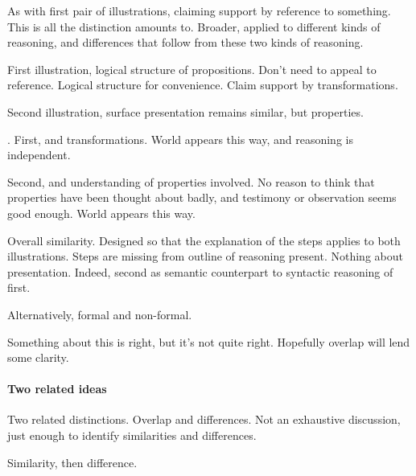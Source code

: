 \begin{note}
  As with first pair of illustrations, claiming support by reference to something.
  This is all the distinction amounts to.
  Broader, applied to different kinds of reasoning, and differences that follow from these two kinds of reasoning.
\end{note}

\begin{note}[Difference]
  First illustration, logical structure of propositions.
  Don't need to appeal to reference.
  Logical structure for convenience.
  Claim support by transformations.

  Second illustration, surface presentation remains similar, but properties.

  \mom{}.
  First,  and transformations.
  World appears this way, and reasoning is independent.

  Second,  and understanding of properties involved.
  No reason to think that properties have been thought about badly, and testimony or observation seems good enough.
  World appears this way.
\end{note}

\begin{note}
  Overall similarity.
  Designed so that the explanation of the steps applies to both illustrations.
  Steps are missing from outline of reasoning present.
  Nothing about presentation.
  Indeed, second as semantic counterpart to syntactic reasoning of first.

  Alternatively, formal and non-formal.

  Something about this is right, but it's not quite right.
  Hopefully overlap will lend some clarity.
\end{note}

\paragraph*{Two related ideas}

\begin{note}
  Two related distinctions.
  Overlap and differences.
  Not an exhaustive discussion, just enough to identify similarities and differences.

  Similarity, then difference.
\end{note}

